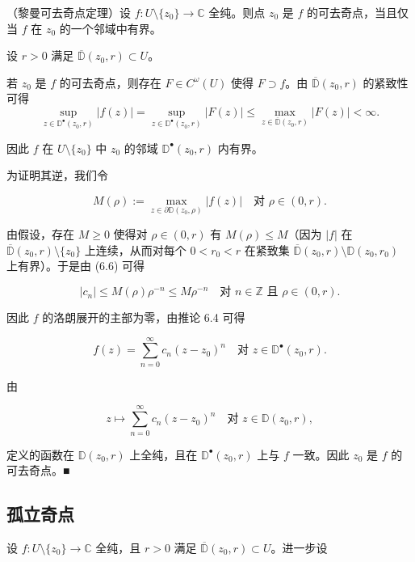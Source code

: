\begin{theorem}

（黎曼可去奇点定理）设 $ f : U\setminus\{z_{0}\} \to \mathbb{C} $ 全纯。则点 $ z_{0} $ 是 $ f $ 的可去奇点，当且仅当 $ f $ 在 $ z_{0} $ 的一个邻域中有界。

\proofhead
设 $ r > 0 $ 满足 $ \overline{\mathbb{D}}(z_{0},r) \subset U $。

若 $ z_{0} $ 是 $ f $ 的可去奇点，则存在 $ F \in C^{\omega}(U) $ 使得 $ F \supset f $。由 $ \overline{\mathbb{D}}(z_{0},r) $ 的紧致性可得
\[
\sup_{z\in\mathbb{D}^{\bullet}(z_{0},r)}|f(z)| = \sup_{z\in\mathbb{D}^{\bullet}(z_{0},r)}|F(z)| \le \max_{z\in\overline{\mathbb{D}}(z_{0},r)}|F(z)| < \infty .
\]

因此 $ f $ 在 $ U\setminus\{z_{0}\} $ 中 $ z_{0} $ 的邻域 $ \mathbb{D}^{\bullet}(z_{0},r) $ 内有界。

为证明其逆，我们令

\[
M(\rho) := \max_{z\in\partial\mathbb{D}(z_{0},\rho)}|f(z)| \quad\text{对 } \rho \in (0,r) .
\]

由假设，存在 $ M \ge 0 $ 使得对 $ \rho \in (0,r) $ 有 $ M(\rho) \le M $（因为 $ |f| $ 在 $ \overline{\mathbb{D}}(z_{0},r)\setminus\{z_{0}\} $ 上连续，从而对每个 $ 0 < r_{0} < r $ 在紧致集 $ \overline{\mathbb{D}}(z_{0},r)\setminus\mathbb{D}(z_{0},r_{0}) $ 上有界）。于是由 (6.6) 可得

\[
|c_{n}| \le M(\rho)\rho^{-n} \le M\rho^{-n} \quad\text{对 } n \in \mathbb{Z} \text{ 且 } \rho \in (0,r) .
\]

因此 $ f $ 的洛朗展开的主部为零，由推论 6.4 可得

\[
f(z) = \sum_{n=0}^{\infty} c_{n}(z - z_{0})^{n} \quad\text{对 } z \in \mathbb{D}^{\bullet}(z_{0},r) .
\]

由

\[
z \mapsto \sum_{n=0}^{\infty} c_{n}(z - z_{0})^{n} \quad\text{对 } z \in \mathbb{D}(z_{0},r) ,
\]

定义的函数在 $ \mathbb{D}(z_{0},r) $ 上全纯，且在 $ \mathbb{D}^{\bullet}(z_{0},r) $ 上与 $ f $ 一致。因此 $ z_{0} $ 是 $ f $ 的可去奇点。\nobreak\hspace{0.35em}■

\end{theorem}

\subsection*{孤立奇点}

设 $ f : U\setminus\{z_{0}\} \to \mathbb{C} $ 全纯，且 $ r > 0 $ 满足 $ \overline{\mathbb{D}}(z_{0},r) \subset U $。进一步设

